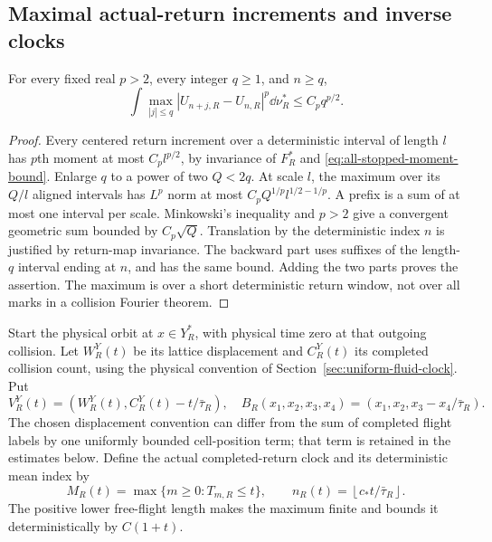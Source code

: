 \subsection{Maximal actual-return increments and inverse clocks}
\begin{lemma}
\label{lem:actual-return-window-maximal}
For every fixed real $p>2$, every integer $q\ge1$, and $n\ge q$,
\begin{equation}\label{eq:actual-return-window-maximal}
 \int\max_{|j|\le q}|U_{n+j,R}-U_{n,R}|^p\dd\nu_R^*
                       \le C_p q^{p/2}.
\end{equation}
\end{lemma}
\begin{proof}
Every centered return increment over a deterministic interval of
length $l$ has $p$th moment at most $C_p l^{p/2}$, by invariance of
$F_R^*$ and \eqref{eq:all-stopped-moment-bound}. Enlarge $q$ to a
power of two $Q<2q$. At scale $l$, the maximum over its $Q/l$
aligned intervals has $L^p$ norm at most
$C_p Q^{1/p}l^{1/2-1/p}$. A prefix is a sum of at most one interval
per scale. Minkowski's inequality and $p>2$ give a convergent geometric
sum bounded by $C_p\sqrt Q$. Translation by the deterministic index
$n$ is justified by return-map invariance. The backward part uses
suffixes of the length-$q$ interval ending at $n$, and has the same
bound. Adding the two parts proves the assertion. The maximum is over
a short deterministic return window, not over all marks in a
collision Fourier theorem.
\end{proof}

Start the physical orbit at $x\in Y_R^*$, with physical time zero at
that outgoing collision. Let $W_R^Y(t)$ be its lattice displacement
and $C_R^Y(t)$ its completed collision count, using the physical
convention of Section~\ref{sec:uniform-fluid-clock}. Put
\begin{equation}\label{eq:section-start-physical-vector}
 V_R^Y(t)=\left(W_R^Y(t),C_R^Y(t)-t/\bar\tau_R\right),\quad
 B_R(x_1,x_2,x_3,x_4)=(x_1,x_2,x_3-x_4/\bar\tau_R).
\end{equation}
The chosen displacement convention can differ from the sum of completed
flight labels by one uniformly bounded cell-position term; that term
is retained in the estimates below. Define the actual completed-return
clock and its deterministic mean index by
\begin{equation}\label{eq:physical-return-index}
 M_R(t)=\max\{m\ge0:T_{m,R}\le t\},\qquad
 n_R(t)=\left\lfloor c_*t/\bar\tau_R\right\rfloor.
\end{equation}
The positive lower free-flight length makes the maximum finite and
bounds it deterministically by $C(1+t)$.


